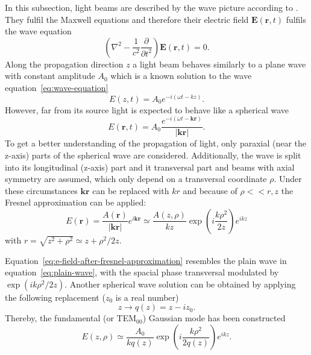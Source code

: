 In this subsection, light beams are described by the wave picture according to \textcite{meschede_optik_2008}.
They fulfil the Maxwell equations and therefore their electric field $\mathbf{E}(\mathbf{r},t)$  fulfils the wave equation
\begin{equation}
\label{eq:wave-equation}
\left(\nabla^2 - \frac{1}{c^2}\frac{\partial}{\partial t^2}\right)\mathbf{E}(\mathbf{r},t) = 0.
\end{equation}
Along the propagation direction $z$ a light beam behaves similarly to a plane wave with constant amplitude $A_0$ which is a known solution to the wave equation~\eqref{eq:wave-equation}
\begin{equation}
\label{eq:plain-wave}
E(z,t)=A_0e^{-i(\omega t - kz)}.
\end{equation}
However, far from its source light is expected to behave like a spherical wave
\begin{equation}
E(\mathbf{r},t)=A_0\frac{e^{-i(\omega t -\mathbf{kr})}}{|\mathbf{kr}|}.
\end{equation}
To get a better understanding of the propagation of light, only paraxial (near the z-axis) parts  of the spherical wave are considered.
Additionally, the wave is split into its longitudinal (z-axis) part and it transversal part and beams with axial symmetry are assumed, which only depend on a transversal coordinate $\rho$.
Under these circumstances $\mathbf{kr}$ can be replaced with $kr$ and because of $\rho<<r,z$ the Fresnel approximation can be applied:
\begin{equation}
\label{eq:e-field-after-fresnel-approximation}
E(\mathbf{r})=\frac{A(\mathbf{r})}{|\mathbf{kr}|}e^{i\mathbf{kr}}\simeq\frac{A(z,\rho)}{kz}\exp\left(i\frac{k\rho^2}{2z}\right)e^{ikz}
\end{equation}
with $r = \sqrt{z^2+\rho^2} \simeq z+\rho^2/2z$.

Equation~\eqref{eq:e-field-after-fresnel-approximation} resembles the plain wave in equation~\eqref{eq:plain-wave}, with the spacial phase transversal modulated by $\exp(ik\rho^2/2z)$.
Another spherical wave solution can be obtained by applying the following replacement ($z_0$ is a real number)
\begin{equation}
z \rightarrow q(z)=z-iz_0.
\end{equation}
Thereby, the fundamental (or TEM$_{00}$) Gaussian mode has been constructed
\begin{equation}
\label{eq:fundamental-gaussian-mode}
E(z,\rho)\simeq\frac{A_0}{kq(z)}\exp\left(i\frac{k\rho^2}{2q(z)}\right)e^{ikz}.
\end{equation}


